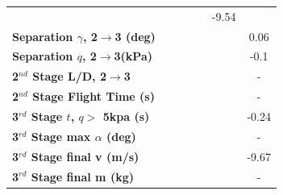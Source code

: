 \begin{table}[ht]
\begin{tabular}{l c c c c c c}
		& \secondthirdSeparationvmSPARTANNinetySevenFiveNoReturn
		& \secondthirdSeparationvmSPARTANStandardNoReturn
		& \secondthirdSeparationvmSPARTANOneHundredTwoFiveNoReturn
		& \secondthirdSeparationvmSPARTANOneHundredFiveNoReturn
		&-9.54
		\\
		\textbf{Separation $\gamma$, 2$\rightarrow$3 (deg)}
		& \secondthirdSeparationgammamSPARTANNinetyFiveNoReturn
		& \secondthirdSeparationgammamSPARTANNinetySevenFiveNoReturn
		& \secondthirdSeparationgammamSPARTANStandardNoReturn
		& \secondthirdSeparationgammamSPARTANOneHundredTwoFiveNoReturn
		& \secondthirdSeparationgammamSPARTANOneHundredFiveNoReturn
		&0.06
		\\
		\textbf{Separation $q$, 2$\rightarrow$3(kPa)}
		& \secondthirdSeparationqmSPARTANNinetyFiveNoReturn
		& \secondthirdSeparationqmSPARTANNinetySevenFiveNoReturn
		& \secondthirdSeparationqmSPARTANStandardNoReturn
		& \secondthirdSeparationqmSPARTANOneHundredTwoFiveNoReturn
		& \secondthirdSeparationqmSPARTANOneHundredFiveNoReturn
		&-0.1
		\\
		\textbf{2$^{nd}$ Stage L/D, 2$\rightarrow$3}
		& \secondthirdSeparationNetIspmSPARTANNinetyFiveNoReturn
		& \secondthirdSeparationNetIspmSPARTANNinetySevenFiveNoReturn
		& \secondthirdSeparationNetIspmSPARTANStandardNoReturn
		& \secondthirdSeparationNetIspmSPARTANOneHundredTwoFiveNoReturn
		& \secondthirdSeparationNetIspmSPARTANOneHundredFiveNoReturn
		& -
		\\
		\textbf{2$^{nd}$ Stage Flight Time (s)}
		& \secondFlightTimemSPARTANNinetyFiveNoReturn
		& \secondFlightTimemSPARTANNinetySevenFiveNoReturn
		& \secondFlightTimemSPARTANStandardNoReturn
		& \secondFlightTimemSPARTANOneHundredTwoFiveNoReturn
		& \secondFlightTimemSPARTANOneHundredFiveNoReturn
		& -
		\\
		\textbf{3$^{rd}$ Stage $t$, $q >$ 5kpa (s)}
		& \thirdqOverFivemSPARTANNinetyFiveNoReturn
		& \thirdqOverFivemSPARTANNinetySevenFiveNoReturn
		& \thirdqOverFivemSPARTANStandardNoReturn
		& \thirdqOverFivemSPARTANOneHundredTwoFiveNoReturn
		& \thirdqOverFivemSPARTANOneHundredFiveNoReturn
		&-0.24
		\\
		\textbf{3$^{rd}$ Stage max $\alpha$ (deg)}
		& \thirdmaxAoAmSPARTANNinetyFiveNoReturn
		& \thirdmaxAoAmSPARTANNinetySevenFiveNoReturn
		& \thirdmaxAoAmSPARTANStandardNoReturn
		& \thirdmaxAoAmSPARTANOneHundredTwoFiveNoReturn
		& \thirdmaxAoAmSPARTANOneHundredFiveNoReturn
		& -
		\\
		\textbf{3$^{rd}$ Stage final v (m/s)}
		& \thirdcircvmSPARTANNinetyFiveNoReturn
		& \thirdcircvmSPARTANNinetySevenFiveNoReturn
		& \thirdcircvmSPARTANStandardNoReturn
		& \thirdcircvmSPARTANOneHundredTwoFiveNoReturn
		& \thirdcircvmSPARTANOneHundredFiveNoReturn
		&-9.67
		\\
		\textbf{3$^{rd}$ Stage final m (kg)}
		& \thirdcircmmSPARTANNinetyFiveNoReturn
		& \thirdcircmmSPARTANNinetySevenFiveNoReturn
		& \thirdcircmmSPARTANStandardNoReturn
		& \thirdcircmmSPARTANOneHundredTwoFiveNoReturn
		& \thirdcircmmSPARTANOneHundredFiveNoReturn
		& -
		\\
		\hline 
	\end{tabular} 
	
\end{table}


